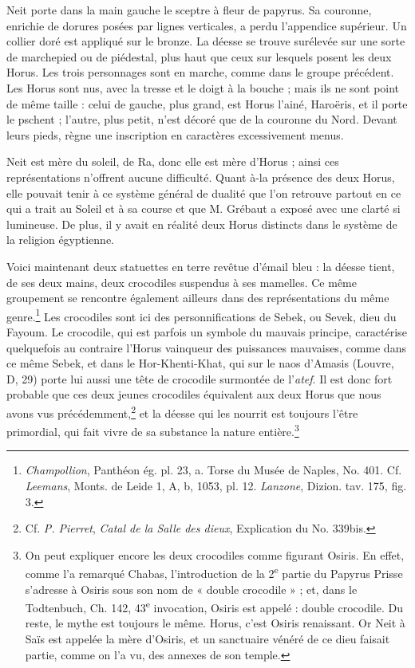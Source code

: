 \documentclass[a4paper, 11pt, oneside]{article}
\begin{document}
Neit porte dans la main gauche le sceptre à fleur de papyrus. Sa couronne, enrichie de dorures posées par lignes verticales, a perdu l'appendice supérieur. Un collier doré est appliqué sur le bronze. La déesse se trouve surélevée sur une sorte de marchepied ou de piédestal, plus haut que ceux sur lesquels posent les deux Horus. Les trois personnages sont en marche, comme dans le groupe précédent. Les Horus sont nus, avec la tresse et le doigt à la bouche ; mais ils ne sont point de même taille : celui de gauche, plus grand, est Horus l'ainé, Haroëris, et il porte le pschent ; l'autre, plus petit, n'est décoré que de la couronne du Nord. Devant leurs pieds, règne une inscription en caractères excessivement menus.

Neit est mère du soleil, de Ra, donc elle est mère d'Horus ; ainsi ces représentations n'offrent aucune difficulté. Quant à-la présence des deux Horus, elle pouvait tenir à ce système général de dualité que l'on retrouve partout en ce qui a trait au Soleil et à sa course et que M. Grébaut a exposé avec une clarté si lumineuse. De plus, il y avait en réalité deux Horus distincts dans le système de la religion égyptienne.

Voici maintenant deux statuettes en terre revêtue d'émail bleu : la déesse tient, de ses deux mains, deux crocodiles suspendus à ses mamelles. Ce même groupement se rencontre également ailleurs dans des représentations du même genre.\footnote{\emph{Champollion}, Panthéon ég. pl. 23, a. Torse du Musée de Naples, No. 401. Cf. \emph{Leemans}, Monts. de Leide 1, A, b, 1053, pl. 12. \emph{Lanzone}, Dizion. tav. 175, fig. 3.} Les crocodiles sont ici des personnifications de Sebek, ou Sevek, dieu du Fayoum. Le crocodile, qui est parfois un symbole du mauvais principe, caractérise quelquefois au contraire l'Horus vainqueur des puissances mauvaises, comme dans ce même Sebek, et dans le Hor-Khenti-Khat, qui sur le naos d'Amasis (Louvre, D, 29) porte lui aussi une tête de crocodile surmontée de l'\emph{atef}. Il est donc fort probable que ces deux jeunes crocodiles équivalent aux deux Horus que nous avons vus précédemment,\footnote{Cf. \emph{P. Pierret}, \emph{Catal de la Salle des dieux}, Explication du No. 339bis.} et la déesse qui les nourrit est toujours l'être primordial, qui fait vivre de sa substance la nature entière.\footnote{On peut expliquer encore les deux crocodiles comme figurant Osiris. En effet, comme l'a remarqué Chabas, l'introduction de la 2\textsuperscript{e} partie du Papyrus Prisse s'adresse à Osiris sous son nom de « double crocodile » ; et, dans le Todtenbuch, Ch. 142, 43\textsuperscript{e} invocation, Osiris est appelé : double crocodile. Du reste, le mythe est toujours le même. Horus, c'est Osiris renaissant. Or Neit à Saïs est appelée la mère d'Osiris, et un sanctuaire vénéré de ce dieu faisait partie, comme on l'a vu, des annexes de son temple.}
\end{document}
